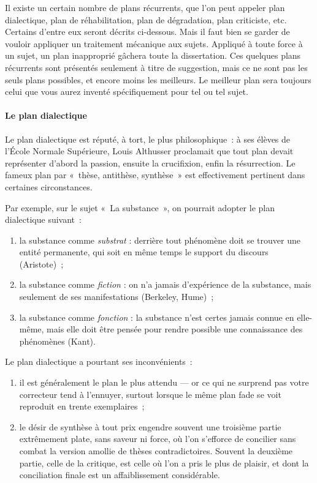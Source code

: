 \documentclass[a4paper]{article}
\begin{document}
Il existe un certain nombre de plans récurrents, que l'on peut appeler
plan dialectique, plan de réhabilitation, plan de dégradation, plan
criticiste, etc. Certains d'entre eux seront décrits ci-dessous. Mais il
faut bien se garder de vouloir appliquer un traitement mécanique aux
sujets. Appliqué à toute force à un sujet, un plan inapproprié gâchera
toute la dissertation. Ces quelques plans récurrents sont présentés
seulement à titre de suggestion, mais ce ne sont pas les seuls plans
possibles, et encore moins les meilleurs. Le meilleur plan sera toujours
celui que vous aurez inventé spécifiquement pour tel ou tel sujet.

\paragraph{Le plan dialectique}
\label{sec-2-4-2-1}

Le plan dialectique est réputé, à tort, le plus philosophique : à ses
élèves de l'École Normale Supérieure, Louis Althusser proclamait que
tout plan devait représenter d'abord la passion, ensuite la crucifixion,
enfin la résurrection. Le fameux plan par « thèse, antithèse, synthèse »
est effectivement pertinent dans certaines circonstances.

Par exemple, sur le sujet « La substance », on pourrait adopter le plan
dialectique suivant :

\begin{enumerate}
\item la substance comme \emph{substrat} : derrière tout phénomène doit se
trouver une entité permanente, qui soit en même temps le support du
discours (Aristote) ;

\item la substance comme \emph{fiction} : on n'a jamais d'expérience de la
substance, mais seulement de ses manifestations (Berkeley, Hume) ;

\item la substance comme \emph{fonction} : la substance n'est certes jamais
connue en elle-même, mais elle doit être pensée pour rendre possible
une connaissance des phénomènes (Kant).
\end{enumerate}

Le plan dialectique a pourtant ses inconvénients :

\begin{enumerate}
\item il est généralement le plan le plus attendu --- or ce qui ne surprend
pas votre correcteur tend à l'ennuyer, surtout lorsque le même plan
fade se voit reproduit en trente exemplaires ;

\item le désir de synthèse à tout prix engendre souvent une troisième
partie extrêmement plate, sans saveur ni force, où l'on s'efforce de
concilier sans combat la version amollie de thèses contradictoires.
Souvent la deuxième partie, celle de la critique, est celle où l'on a
pris le plus de plaisir, et dont la conciliation finale est un
affaiblissement considérable.
\end{enumerate}
\end{document}
